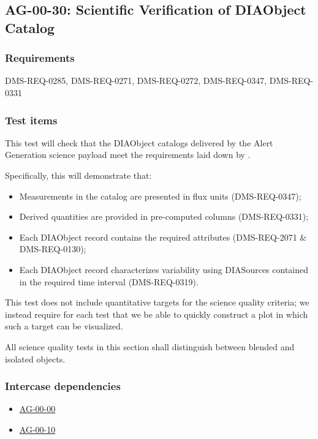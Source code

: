 \subsection{AG-00-30: Scientific Verification of DIAObject Catalog}
\label{AG-00-30}

\subsubsection{Requirements}

DMS-REQ-0285, DMS-REQ-0271, DMS-REQ-0272, DMS-REQ-0347, DMS-REQ-0331

\subsubsection{Test items}
\label{ag-00-30-items}

This test will check that the DIAObject catalogs delivered by the Alert
Generation science
payload meet the requirements laid down by .

Specifically, this will demonstrate that:

\begin{itemize}

  \item{Measurements in the catalog are presented in flux units
  (DMS-REQ-0347);}
  \item{Derived quantities are provided in pre-computed columns
  (DMS-REQ-0331);}
\item{Each DIAObject record contains the required attributes (DMS-REQ-2071 \&
	DMS-REQ-0130);}
	\item{Each DIAObject record characterizes variability using
		DIASources contained in the required time interval
		(DMS-REQ-0319).}
\end{itemize}

This test does not include quantitative targets for the science quality criteria; we instead require for each test that we be able to quickly construct a plot in which such a target can be visualized.

All science quality tests in this section shall distinguish between blended and isolated objects.

\subsubsection{Intercase dependencies}

\begin{itemize}

  \item{\hyperref[ag-00-00]{AG-00-00}}
  \item{\hyperref[ag-00-10]{AG-00-10}}

\end{itemize}


